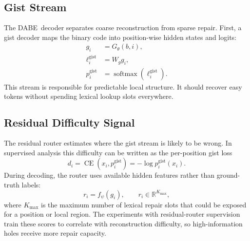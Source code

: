 \documentclass[11pt]{article}
\newcommand{\dabe}{\textsc{DABE}}
\newcommand{\softmax}{\operatorname{softmax}}
\newcommand{\CE}{\operatorname{CE}}
\begin{document}
\subsection{Gist Stream}
The \dabe\ decoder separates coarse reconstruction from sparse repair. First, a gist decoder maps the binary code into position-wise hidden states and logits:
\begin{align}
  g_i &= G_\theta(b, i), \\
  \ell_i^{\mathrm{gist}} &= W_g g_i, \\
  p_i^{\mathrm{gist}} &= \softmax(\ell_i^{\mathrm{gist}}).
\end{align}
This stream is responsible for predictable local structure. It should recover easy tokens without spending lexical lookup slots everywhere.

\subsection{Residual Difficulty Signal}
The residual router estimates where the gist stream is likely to be wrong. In supervised analysis this difficulty can be written as the per-position gist loss
\begin{equation}
  d_i = \CE(x_i, p_i^{\mathrm{gist}}) = -\log p_i^{\mathrm{gist}}(x_i).
\end{equation}
During decoding, the router uses available hidden features rather than ground-truth labels:
\begin{equation}
  r_i = f_\psi(g_i), \qquad r_i \in \mathbb{R}^{K_{\max}},
\end{equation}
where $K_{\max}$ is the maximum number of lexical repair slots that could be exposed for a position or local region. The experiments with residual-router supervision train these scores to correlate with reconstruction difficulty, so high-information holes receive more repair capacity.
\end{document}
